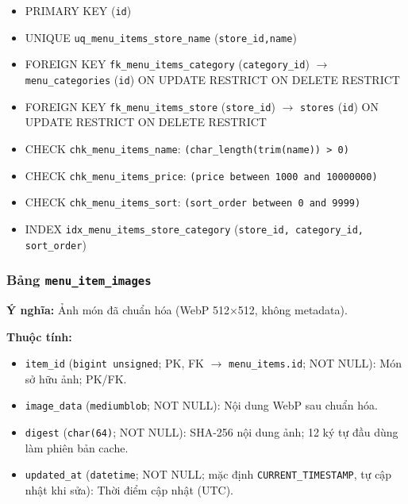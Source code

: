 \begin{itemize}

\item PRIMARY KEY (\texttt{id})

\item UNIQUE \texttt{uq\_menu\_items\_store\_name} (\texttt{store\_id,name})

\item FOREIGN KEY \texttt{fk\_menu\_items\_category} (\texttt{category\_id}) $\rightarrow$ \texttt{menu\_categories} (\texttt{id}) ON UPDATE RESTRICT ON DELETE RESTRICT

\item FOREIGN KEY \texttt{fk\_menu\_items\_store} (\texttt{store\_id}) $\rightarrow$ \texttt{stores} (\texttt{id}) ON UPDATE RESTRICT ON DELETE RESTRICT

\item CHECK \texttt{chk\_menu\_items\_name}: \texttt{(char\_length(trim(name)) > 0)}

\item CHECK \texttt{chk\_menu\_items\_price}: \texttt{(price between 1000 and 10000000)}

\item CHECK \texttt{chk\_menu\_items\_sort}: \texttt{(sort\_order between 0 and 9999)}

\item INDEX \texttt{idx\_menu\_items\_store\_category} (\texttt{store\_id, category\_id, sort\_order})

\end{itemize}

\subsubsection{Bảng \texttt{menu\_item\_images}}

\textbf{Ý nghĩa:} Ảnh món đã chuẩn hóa (WebP 512×512, không metadata).\par

\textbf{Thuộc tính:}

\begin{itemize}

\item \texttt{item\_id} (\texttt{bigint unsigned}; PK, FK $\rightarrow$ \texttt{menu\_items.id}; NOT NULL): Món sở hữu ảnh; PK/FK.

\item \texttt{image\_data} (\texttt{mediumblob}; NOT NULL): Nội dung WebP sau chuẩn hóa.

\item \texttt{digest} (\texttt{char(64)}; NOT NULL): SHA-256 nội dung ảnh; 12 ký tự đầu dùng làm phiên bản cache.

\item \texttt{updated\_at} (\texttt{datetime}; NOT NULL; mặc định \texttt{CURRENT\_TIMESTAMP}, tự cập nhật khi sửa): Thời điểm cập nhật (UTC).

\end{itemize}

